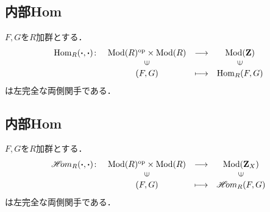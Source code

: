 






























\subsection{内部Hom}
\begin{PRP}[Homは左完全]
    $F,G$を$R$加群とする．
    \begin{equation*}
        \begin{array}{rccc}
            \Hom_R({\boldsymbol{\cdot}},{\boldsymbol{\cdot}})\colon
            &\Mod(R)^{\op}\times\Mod(R)
            &\longrightarrow&\Mod(\zz)\\
            &\rotatebox{90}{$\in$}&&\rotatebox{90}{$\in$}\\
            & (F,G)&\longmapsto&\Hom_R(F,G)
        \end{array}
    \end{equation*}
    は左完全な両側関手である．
\end{PRP}


\subsection{内部Hom}
\begin{PRP}[Homは左完全]
    $F,G$を$R$加群とする．
    \begin{equation*}
        \begin{array}{rccc}
            \HOM_R({\boldsymbol{\cdot}},{\boldsymbol{\cdot}})\colon
            &\Mod(R)^{\op}\times\Mod(R)
            &\longrightarrow&\Mod(\zz_X)\\
            &\rotatebox{90}{$\in$}&&\rotatebox{90}{$\in$}\\
            & (F,G)&\longmapsto&\HOM_R(F,G)
        \end{array}
    \end{equation*}
    は左完全な両側関手である．
\end{PRP}

